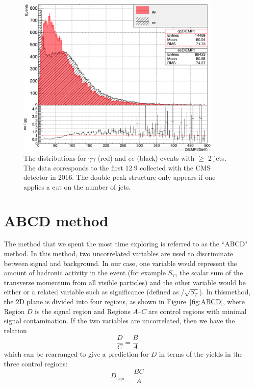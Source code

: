 \begin{figure}[h]
\begin{center}
\includegraphics[width=0.9\textwidth]{Figures/Appendix/weirdDiempt.png}
\end{center}
\caption[The \diempt distributions for $\gamma\gamma$ and $ee$
events with $\geq$ 2 jets.]
{The \diempt distributions for $\gamma\gamma$ (red) and $ee$ (black)
events with $\geq$ 2 jets. The data corresponds to the first 12.9 \fbinv collected 
with the CMS detector in 2016. The double peak structure only appears if one 
applies a cut on the number of jets. }
\label{fig:weirdDiempt}
\end{figure}

\section{ABCD method}
The method that we spent the most time exploring is referred to as the ``ABCD" method.
In this method, two uncorrelated variables are used to discriminate 
between signal and background. In our case, one variable would represent
the amount of hadronic activity in the event 
(for example $S_T$, the scalar sum of the transverse momentum from all visible particles)
and the other variable would be
either \ETmiss or a related variable such as \ETmiss significance (defined as \ETmiss/$\sqrt{S_T}$).
In thismethod, the 2D plane is divided into four regions,
as shown in Figure~\ref{fig:ABCD}, where Region $D$ is the signal region and 
Regions $A$--$C$ are control regions with minimal signal contamination.
If the two variables are uncorrelated, then we have the relation
\begin{equation}
\frac{D}{C} = \frac{B}{A}
\end{equation}
which can be rearranged to give a prediction for $D$ in terms of the yields 
in the three control regions:
\begin{equation}
D_{exp}= \frac{BC}{A}
\end{equation}

